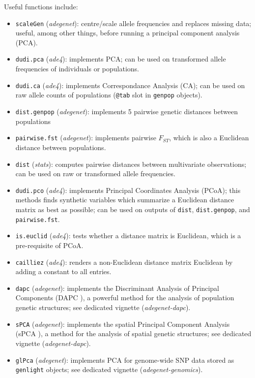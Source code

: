 \documentclass{article}
\begin{document}
Useful functions include:
\begin{itemize}
  \item \texttt{scaleGen} (\textit{adegenet}): centre/scale allele frequencies and replaces missing
    data; useful, among other things, before running a principal component analysis (PCA).
  \item \texttt{dudi.pca} (\textit{ade4}): implements PCA; can be used on transformed allele
    frequencies of individuals or populations.
  \item \texttt{dudi.ca} (\textit{ade4}): implements Correspondance Analysis (CA); can be used on raw
    allele counts of populations (\texttt{@tab} slot in \texttt{genpop} objects).
  \item \texttt{dist.genpop} (\textit{adegenet}): implements 5 pairwise genetic distances between populations
  \item \texttt{pairwise.fst} (\textit{adegenet}): implements pairwise $F_{ST}$, which is also a
    Euclidean distance between populations.
  \item \texttt{dist} (\textit{stats}): computes pairwise distances between multivariate
    observations; can be used on raw or transformed allele frequencies.
  \item \texttt{dudi.pco} (\textit{ade4}): implements Principal Coordinates Analysis (PCoA); this
    methods finds synthetic variables which summarize a Euclidean distance matrix as best as
    possible; can be used on outputs of \texttt{dist}, \texttt{dist.genpop}, and \texttt{pairwise.fst}.
  \item \texttt{is.euclid} (\textit{ade4}): tests whether a distance matrix is Euclidean, which is a
    pre-requisite of PCoA.
  \item \texttt{cailliez} (\textit{ade4}): renders a non-Euclidean distance matrix Euclidean by
    adding a constant to all entries.
  \item \texttt{dapc} (\textit{adegenet}): implements the Discriminant Analysis of Principal
    Components (DAPC \cite{tjart19}), a powerful method for the analysis of population genetic structures; see
    dedicated vignette (\textit{adegenet-dapc}).
  \item \texttt{sPCA} (\textit{adegenet}): implements the spatial Principal Component Analysis
    (sPCA \cite{tjart04}), a method for the analysis of spatial genetic structures; see dedicated vignette (\textit{adegenet-dapc}).
  \item \texttt{glPca} (\textit{adegenet}): implements PCA for genome-wide SNP data stored as
    \texttt{genlight} objects; see dedicated vignette (\textit{adegenet-genomics}).
\end{itemize}
\end{document}
